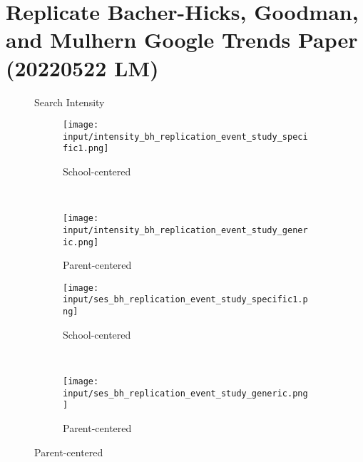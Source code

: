 \section{Replicate Bacher-Hicks, Goodman, and Mulhern Google Trends Paper (20220522 LM)}

\begin{figure}[hbt!]
  \caption{Search Intensity}
    \centering
    \begin{subfigure}[t]{0.45\textwidth}
    \caption{School-centered}
        \centering
        \texttt{[image: input/intensity\_bh\_replication\_event\_study\_specific1.png]}
    \end{subfigure}%
    ~
    \begin{subfigure}[t]{0.45\textwidth}
    \caption{Parent-centered}
        \centering
        \texttt{[image: input/intensity\_bh\_replication\_event\_study\_generic.png]}
    \end{subfigure}
    \caption{High-Low SES Search Intensity Gap}
      \centering
      \begin{subfigure}[t]{0.45\textwidth}
      \caption{School-centered}
          \centering
          \texttt{[image: input/ses\_bh\_replication\_event\_study\_specific1.png]}
      \end{subfigure}%
      ~
      \begin{subfigure}[t]{0.45\textwidth}
      \caption{Parent-centered}
          \centering
          \texttt{[image: input/ses\_bh\_replication\_event\_study\_generic.png]}
      \end{subfigure}
\end{figure}



